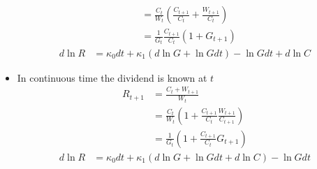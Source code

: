 \documentclass[english]{article}
\begin{document}
\begin{itemize}
\begin{align*}
		&= \frac{C_{t}}{W_t}(\frac{C_{t+1}}{C_t}+\frac{W_{t+1}}{C_t})\\
		&= \frac{1}{G_t}\frac{C_{t+1}}{C_t}(1+G_{t+1})
	\end{align*}
	\begin{align*}
		d\ln R &= \kappa_0dt + \kappa_1(d\ln G + \ln G dt) - \ln Gdt + d\ln C
	\end{align*}
	\item In continuous time the dividend is known at $t$
	\begin{align*}
		R_{t+1} &= \frac{C_{t}+ W_{t+1}}{W_t}\\
		&= \frac{C_{t}}{W_t}(1 + \frac{C_{t+1}}{C_{t}}\frac{W_{t+1}}{C_{t+1}})\\
		&= \frac{1}{G_t}(1 + \frac{C_{t+1}}{C_t}G_{t+1})
	\end{align*}
	\begin{align*}
		d\ln R &= \kappa_0dt + \kappa_1(d\ln G + \ln G dt + d\ln C) - \ln Gdt
	\end{align*}
\end{itemize}
\end{document}
